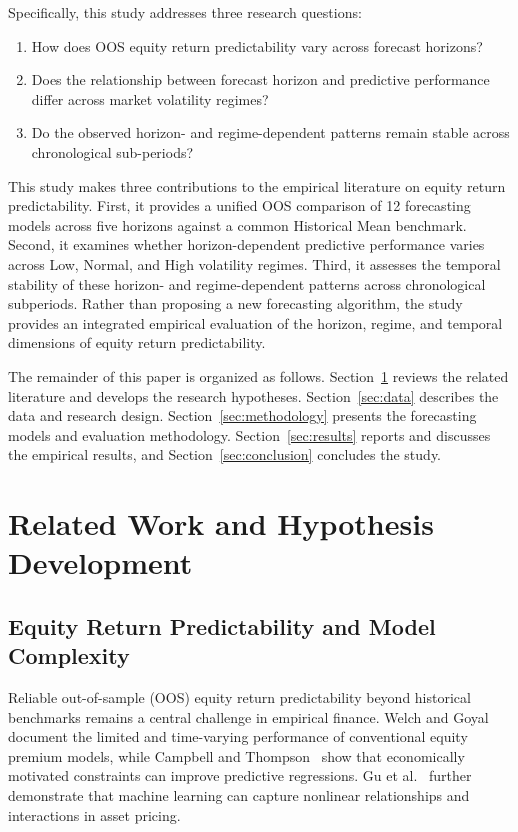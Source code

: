 \documentclass[runningheads,orivec]{llncs}
\begin{document}
Specifically, this study addresses three research questions:
\begin{enumerate}
\item How does OOS equity return predictability vary across forecast horizons?
\item Does the relationship between forecast horizon and predictive performance differ across market volatility regimes?
\item Do the observed horizon- and regime-dependent patterns remain stable across chronological sub-periods?
\end{enumerate}

This study makes three contributions to the empirical literature on equity return predictability. First, it provides a unified OOS comparison of 12 forecasting models across five horizons against a common Historical Mean benchmark. Second, it examines whether horizon-dependent predictive performance varies across Low, Normal, and High volatility regimes. Third, it assesses the temporal stability of these horizon- and regime-dependent patterns across chronological subperiods. Rather than proposing a new forecasting algorithm, the study provides an integrated empirical evaluation of the horizon, regime, and temporal dimensions of equity return predictability.

The remainder of this paper is organized as follows. Section~\ref{sec:lit_review} reviews the related literature and develops the research hypotheses. Section~\ref{sec:data} describes the data and research design. Section~\ref{sec:methodology} presents the forecasting models and evaluation methodology. Section~\ref{sec:results} reports and discusses the empirical results, and Section~\ref{sec:conclusion} concludes the study.


\section{Related Work and Hypothesis Development}\label{sec:lit_review}

\subsection{Equity Return Predictability and Model Complexity}

Reliable out-of-sample (OOS) equity return predictability beyond historical benchmarks remains a central challenge in empirical finance. Welch and Goyal~\cite{welch2008} document the limited and time-varying performance of conventional equity premium models, while Campbell and Thompson~\cite{campbell2008} show that economically motivated constraints can improve predictive regressions. Gu et al.~\cite{gu2020} further demonstrate that machine learning can capture nonlinear relationships and interactions in asset pricing.
\end{document}
